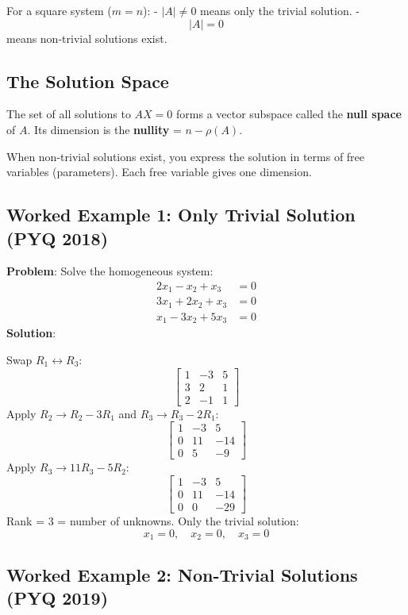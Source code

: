 \documentclass[
]{article}
\begin{document}
For a square system (\(m = n\)): - \(\lvert A \rvert \neq 0\) means only
the trivial solution. -
\[
\lvert A \rvert = 0
\]
means non-trivial solutions exist.

\subsection{The Solution Space}\label{the-solution-space}

The set of all solutions to \(AX = 0\) forms a vector subspace called
the \textbf{null space} of \(A\). Its dimension is the \textbf{nullity}
= \(n - \rho(A)\).

When non-trivial solutions exist, you express the solution in terms of
free variables (parameters). Each free variable gives one dimension.

\subsection{Worked Example 1: Only Trivial Solution (PYQ
2018)}\label{worked-example-1-only-trivial-solution-pyq-2018}

\textbf{Problem}: Solve the homogeneous system:
\[
\begin{aligned}
2x_1 - x_2 + x_3 &= 0 \\
3x_1 + 2x_2 + x_3 &= 0 \\
x_1 - 3x_2 + 5x_3 &= 0
\end{aligned}
\]
\textbf{Solution}:

Swap \(R_1 \leftrightarrow R_3\):
\[
\begin{bmatrix}
1 & -3 & 5 \\
3 & 2 & 1 \\
2 & -1 & 1
\end{bmatrix}
\]
Apply \(R_2 \to R_2 - 3R_1\) and \(R_3 \to R_3 - 2R_1\):
\[
\begin{bmatrix}
1 & -3 & 5 \\
0 & 11 & -14 \\
0 & 5 & -9
\end{bmatrix}
\]
Apply \(R_3 \to 11R_3 - 5R_2\):
\[
\begin{bmatrix}
1 & -3 & 5 \\
0 & 11 & -14 \\
0 & 0 & -29
\end{bmatrix}
\]
Rank = 3 = number of unknowns. Only the trivial solution:
\[
x_1 = 0, \quad x_2 = 0, \quad x_3 = 0
\]

\subsection{Worked Example 2: Non-Trivial Solutions (PYQ
2019)}\label{worked-example-2-non-trivial-solutions-pyq-2019}
\end{document}
